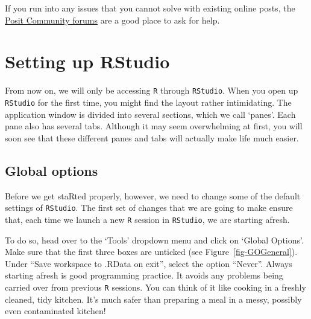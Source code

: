\documentclass[
  letterpaper,
  DIV=11,
  numbers=noendperiod,
  oneside]{scrreprt}
\begin{document}
If you run into any issues that you cannot solve with existing online
posts, the \href{https://forum.posit.co/}{Posit Community forums} are a
good place to ask for help.

\section{Setting up RStudio}\label{setting-up-rstudio}

From now on, we will only be accessing \texttt{R} through
\texttt{RStudio}. When you open up \texttt{RStudio} for the first time,
you might find the layout rather intimidating. The application window is
divided into several sections, which we call `panes'. Each pane also has
several tabs. Although it may seem overwhelming at first, you will soon
see that these different panes and tabs will actually make life much
easier.

\subsection{Global options}\label{global-options}

Before we get staRted properly, however, we need to change some of the
default settings of \texttt{RStudio}. The first set of changes that we
are going to make ensure that, each time we launch a new \texttt{R}
session in \texttt{RStudio}, we are starting afresh.

To do so, head over to the `Tools' dropdown menu and click on `Global
Options'. Make sure that the first three boxes are unticked (see
Figure~\ref{fig-GOGeneral}). Under ``Save workspace to .RData on exit'',
select the option ``Never''. Always starting afresh is good programming
practice. It avoids any problems being carried over from previous
\texttt{R} sessions. You can think of it like cooking in a freshly
cleaned, tidy kitchen. It's much safer than preparing a meal in a messy,
possibly even contaminated kitchen! {}
\end{document}
